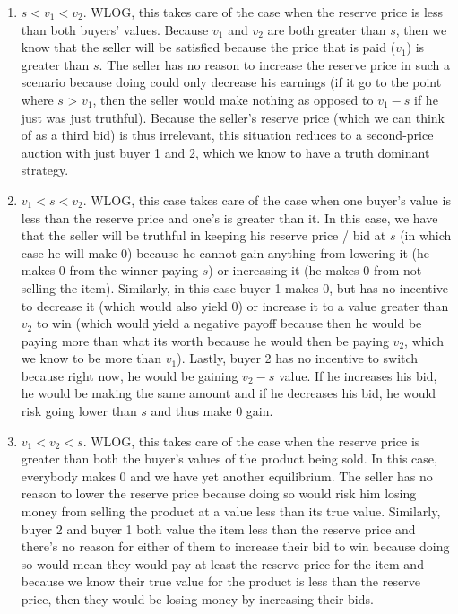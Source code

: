 \documentclass[12 pt]{article}
\begin{document}
	\begin{enumerate}
		\item $s < v_1 < v_2$. WLOG, this takes care of the case when the reserve price is less than both buyers' values. Because $v_1$ and $v_2$ are both greater than $s$, then we know that the seller will be satisfied because the price that is paid ($v_1$) is greater than $s$. The seller has no reason to increase the reserve price in such a scenario because doing could only decrease his earnings (if it go to the point where $s$ > $v_1$, then the seller would make nothing as opposed to $v_1 - s$ if he just was just truthful). Because the seller's reserve price (which we can think of as a third bid) is thus irrelevant, this situation reduces to a second-price auction with just buyer 1 and 2, which we know to have a truth dominant strategy. 
		\item $v_1 < s < v_2$. WLOG, this case takes care of the case when one buyer's value is less than the reserve price and one's is greater than it. In this case, we have that the seller will be truthful in keeping his reserve price / bid at $s$ (in which case he will make 0) because he cannot gain anything from lowering it (he makes 0 from the winner paying $s$) or increasing it (he makes 0 from not selling the item). Similarly, in this case buyer 1 makes 0, but has no incentive to decrease it (which would also yield 0) or increase it to a value greater than $v_2$ to win (which would yield a negative payoff because then he would be paying more than what its worth because he would then be paying $v_2$, which we know to be more than $v_1$). Lastly, buyer 2 has no incentive to switch because right now, he would be gaining $v_2 - s$ value. If he increases his bid, he would be making the same amount and if he decreases his bid, he would risk going lower than $s$ and thus make 0 gain. 
		\item $v_1 < v_2 < s$. WLOG, this takes care of the case when the reserve price is greater than both the buyer's values of the product being sold. In this case, everybody makes 0 and we have yet another equilibrium. The seller has no reason to lower the reserve price because doing so would risk him losing money from selling the product at a value less than its true value. Similarly, buyer 2 and buyer 1 both value the item less than the reserve price and there's no reason for either of them to increase their bid to win because doing so would mean they would pay at least the reserve price for the item and because we know their true value for the product is less than the reserve price, then they would be losing money by increasing their bids. 
	\end{enumerate}
\end{document}
